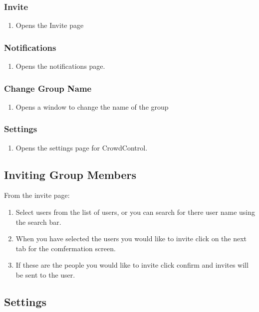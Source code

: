   	\subsubsection{Invite}
  	\begin{enumerate}
		\item Opens the Invite page
 	\end{enumerate}
	\subsubsection{Notifications}
 	\begin{enumerate}
		\item Opens the notifications page.
 	\end{enumerate}
 	\subsubsection{Change Group Name}
 	\begin{enumerate}
		\item Opens a window to change the name of the group
 	\end{enumerate}
 	\subsubsection{Settings}
 	\begin{enumerate}
		\item Opens the settings page for CrowdControl.
 	\end{enumerate}
 
 
 \subsection{Inviting Group Members}
 From the invite page:
 \begin{enumerate}
 \item Select users from the list of users, or you can search for there user name using the search bar.
 \item When you have selected the users you would like to invite click on the next tab for the comfermation screen.
 \item If these are the people you would like to invite click confirm and invites will be sent to the user.
 \end{enumerate}
 
 \subsection{Settings}
